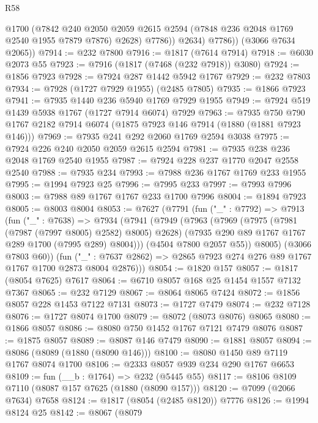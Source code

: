 \begin{lexlean}{R58}
\begin{coremodule}
                @1700
                (@7842
                  @240
                  @2050
                  @2059
                  @2615
                  @2594
                  (@7848 @236 @2048 @1769 @2540 @1955 @7879 @7876)
                  @2628)
                @7786))
            @2634)
          @7786))
      (@3066 @7634 @2065))
@7914 := @232 @7800
@7916 := @1817 (@7614 @7914)
@7918 := @6030 @2073 @55
@7923 := @7916 (@1817 (@7468 (@232 @7918)) @3080)
@7924 := @1856 @7923
@7928 := @7924 @287 @1442 @5942 @1767
@7929 := @232 @7803
@7934 := @7928 (@1727 @7929 @1955) (@2485 @7805)
@7935 := @1866 @7923
@7941 := @7935 @1440 @236 @5940 @1769 @7929 @1955
@7949 := @7924 @519 @1439 @5938 @1767 (@1727 @7914 @6074) @7929
@7963 := @7935 @750 @790 @1767 @2182 @7914 @6074 (@1875 @7923 @146 @7914 (@1880 (@1881 @7923 @146)))
@7969 := @7935 @241 @292 @2060 @1769 @2594 @3038
@7975 := @7924 @226 @240 @2050 @2059 @2615 @2594
@7981 := @7935 @238 @236 @2048 @1769 @2540 @1955
@7987 := @7924 @228 @237 @1770 @2047 @2558 @2540
@7988 := @7935 @234
@7993 := @7988 @236 @1767 @1769 @233 @1955
@7995 := @1994 @7923 @25
@7996 := @7995 @233
@7997 := @7993 @7996
@8003 := @7988 @89 @1767 @1767 @233 @1700 @7996
@8004 := @1894 @7923
@8005 := @8003 @8004
@8053 := @7627
    (@7791
      (fun ("_" : @7792) =>
      @7913
        (fun ("_" : @7638) =>
        @7934
          (@7941
            (@7949
              (@7963
                (@7969
                  (@7975 (@7981 (@7987 (@7997 @8005) @2582) @8005) @2628)
                  (@7935 @290 @89 @1767 @1767 @289 @1700 (@7995 @289) @8004)))
              (@4504 @7800 @2057 @55))
            @8005)
          (@3066 @7803 @60))
        (fun ("_" : @7637 @2862) => @2865 @7923 @274 @276 @89 @1767 @1767 @1700 @2873 @8004 @2876)))
@8054 := @1820 @157
@8057 := @1817 (@8054 @7625) @7617
@8064 := @6710 @8057 @168 @25 @1454 @1557 @7132 @7367
@8065 := @232 @7129
@8067 := @8064 @8065 @7424
@8072 := @1856 @8057 @228 @1453 @7122 @7131
@8073 := @1727 @7479
@8074 := @232 @7128
@8076 := @1727 @8074 @1700
@8079 := @8072 (@8073 @8076) @8065
@8080 := @1866 @8057
@8086 := @8080 @750 @1452 @1767 @7121 @7479 @8076
@8087 := @1875 @8057
@8089 := @8087 @146 @7479
@8090 := @1881 @8057
@8094 := @8086 (@8089 (@1880 (@8090 @146)))
@8100 := @8080 @1450 @89 @7119 @1767 @8074 @1700
@8106 := @2333 @8057 @939 @234 @290 @1767 @6653
@8109 := fun (__b : @1764) => @232 (@5445 @55)
@8117 := @8106 @8109 @7110 (@8087 @157 @7625 (@1880 (@8090 @157)))
@8120 := @7099 (@2066 @7634) @7658
@8124 := @1817 (@8054 (@2485 @8120)) @7776
@8126 := @1994 @8124 @25
@8142 := @8067
    (@8079

\end{coremodule}
\end{lexlean}
